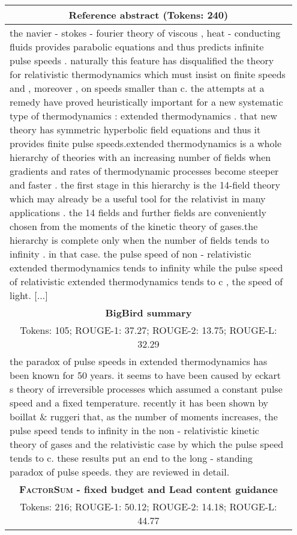 \documentclass[11pt,table]{article}
\newcommand{\modelname}{FactorSum}
\begin{document}
\begin{table*}[ht]
  \centering
  \begin{tabular}{p{0.95\linewidth}}
    \toprule
    \multicolumn{1}{c}{\textbf{Reference abstract} (Tokens: 240)} \\
    \midrule
    the navier - stokes - fourier theory of viscous , heat - conducting fluids provides parabolic equations and thus predicts infinite pulse speeds . naturally this feature has disqualified the theory for relativistic thermodynamics which must insist on finite speeds and , moreover , on speeds smaller than c. the attempts at a remedy have proved heuristically important for a new systematic type of thermodynamics : extended thermodynamics . that new theory has symmetric hyperbolic field equations and thus it provides finite pulse speeds.extended thermodynamics is a whole hierarchy of theories with an increasing number of fields when gradients and rates of thermodynamic processes become steeper and faster . the first stage in this hierarchy is the 14-field theory which may already be a useful tool for the relativist in many applications . the 14 fields  and further fields  are conveniently chosen from the moments of the kinetic theory of gases.the hierarchy is complete only when the number of fields tends to infinity . in that case. the pulse speed of non - relativistic extended thermodynamics tends to infinity while the pulse speed of relativistic extended thermodynamics tends to c , the speed of light. [...]\\
    \midrule
    \multicolumn{1}{c}{\textbf{BigBird summary}} \\
    \multicolumn{1}{c}{Tokens: 105; ROUGE-1: 37.27; ROUGE-2: 13.75; ROUGE-L: 32.29} \\
    \midrule
    the paradox of pulse speeds in extended thermodynamics has been known for 50 years. it seems to have been caused by eckart s theory of irreversible processes which assumed a constant pulse speed and a fixed temperature. recently it has been shown by boillat \& ruggeri that, as the number of moments increases, the pulse speed tends to infinity in the non - relativistic kinetic theory of gases and the relativistic case by which the pulse speed tends to c. these results put an end to the long - standing paradox of pulse speeds. they are reviewed in detail.\\
    \midrule
    \multicolumn{1}{c}{\textbf{\textsc{\modelname} - fixed budget and Lead content guidance}} \\
    \multicolumn{1}{c}{Tokens: 216; ROUGE-1: 50.12; ROUGE-2: 14.18; ROUGE-L: 44.77} \\

\end{tabular}
\end{table*}
\end{document}
